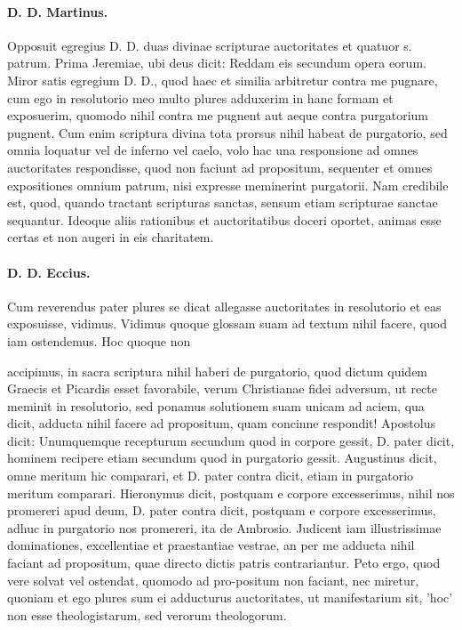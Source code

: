 \paragraph*{D. D. Martinus.}

Opposuit egregius D. D. duas divinae scripturae auctoritates et quatuor s. patrum. Prima Jeremiae, ubi deus dicit: Reddam eis secundum opera eorum. Miror satis egregium D. D., quod haec et similia arbitretur contra me pugnare, cum ego in resolutorio meo multo plures adduxerim in hanc formam et exposuerim, quomodo nihil contra me pugnent aut aeque contra purgatorium pugnent. Cum enim scriptura divina tota prorsus nihil habeat de purgatorio, sed omnia loquatur vel de inferno vel caelo, volo hac una responsione ad omnes auctoritates respondisse, quod non faciunt ad propositum, sequenter et omnes expositiones omnium patrum, nisi expresse meminerint purgatorii. Nam credibile est, quod, quando tractant scripturas sanctas, sensum etiam scripturae sanctae sequantur. Ideoque aliis rationibus et auctoritatibus doceri oportet, animas esse certas et non augeri in eis charitatem.

\paragraph*{D. D. Eccius.}

Cum reverendus pater plures se dicat allegasse auctoritates in resolutorio et eas exposuisse, vidimus. Vidimus quoque glossam suam ad textum nihil facere, quod iam ostendemus. Hoc quoque non

accipimus, in sacra scriptura nihil haberi de purgatorio, quod dictum quidem Graecis et Picardis esset favorabile, verum Christianae fidei adversum, ut recte meminit in resolutorio, sed ponamus solutionem suam unicam ad aciem, qua dicit, adducta nihil facere ad propositum, quam concinne respondit! Apostolus dicit: Unumquemque recepturum secundum quod in corpore gessit, D. pater dicit, hominem recipere etiam secundum quod in purgatorio gessit. Augustinus dicit, omne meritum hic comparari, et D. pater contra dicit, etiam in purgatorio meritum comparari. Hieronymus dicit, postquam e corpore excesserimus, nihil nos promereri apud deum, D. pater contra dicit, postquam e corpore excesserimus, adhuc in purgatorio nos promereri, ita de Ambrosio. Judicent iam illustrissimae dominationes, excellentiae et praestantiae vestrae, an per me adducta nihil faciant ad propositum, quae directo dictis patris contrariantur. Peto ergo, quod vere solvat vel ostendat, quomodo ad pro-\marginpar{\small[324]}positum non faciant, nec miretur, quoniam et ego plures sum ei adducturus auctoritates, ut manifestarium sit, 'hoc' non esse theologistarum, sed verorum theologorum.

